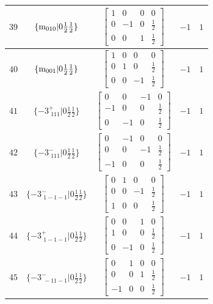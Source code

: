 \documentclass[fleqn,8pt]{jsarticle}
\begin{document}
\begin{longtable}{ccccc}
$ 39 $ & $ \{{\rm m}_{010}|0 \frac{1}{2} \frac{1}{2}\} $ & $ \begin{bmatrix} 1 & 0 & 0 & 0 \\ 0 & -1 & 0 & \frac{1}{2} \\ 0 & 0 & 1 & \frac{1}{2} \end{bmatrix} $ & $ -1 $ & $ 1 $ \\ \hline
$ 40 $ & $ \{{\rm m}_{001}|0 \frac{1}{2} \frac{1}{2}\} $ & $ \begin{bmatrix} 1 & 0 & 0 & 0 \\ 0 & 1 & 0 & \frac{1}{2} \\ 0 & 0 & -1 & \frac{1}{2} \end{bmatrix} $ & $ -1 $ & $ 1 $ \\ \hline
$ 41 $ & $ \{-3^{+}_{\,\,111}|0 \frac{1}{2} \frac{1}{2}\} $ & $ \begin{bmatrix} 0 & 0 & -1 & 0 \\ -1 & 0 & 0 & \frac{1}{2} \\ 0 & -1 & 0 & \frac{1}{2} \end{bmatrix} $ & $ -1 $ & $ 1 $ \\ \hline
$ 42 $ & $ \{-3^{-}_{\,\,111}|0 \frac{1}{2} \frac{1}{2}\} $ & $ \begin{bmatrix} 0 & -1 & 0 & 0 \\ 0 & 0 & -1 & \frac{1}{2} \\ -1 & 0 & 0 & \frac{1}{2} \end{bmatrix} $ & $ -1 $ & $ 1 $ \\ \hline
$ 43 $ & $ \{-3^{-}_{\,\,1-1-1}|0 \frac{1}{2} \frac{1}{2}\} $ & $ \begin{bmatrix} 0 & 1 & 0 & 0 \\ 0 & 0 & -1 & \frac{1}{2} \\ 1 & 0 & 0 & \frac{1}{2} \end{bmatrix} $ & $ -1 $ & $ 1 $ \\ \hline
$ 44 $ & $ \{-3^{+}_{\,\,1-1-1}|0 \frac{1}{2} \frac{1}{2}\} $ & $ \begin{bmatrix} 0 & 0 & 1 & 0 \\ 1 & 0 & 0 & \frac{1}{2} \\ 0 & -1 & 0 & \frac{1}{2} \end{bmatrix} $ & $ -1 $ & $ 1 $ \\ \hline
$ 45 $ & $ \{-3^{-}_{\,\,-11-1}|0 \frac{1}{2} \frac{1}{2}\} $ & $ \begin{bmatrix} 0 & 1 & 0 & 0 \\ 0 & 0 & 1 & \frac{1}{2} \\ -1 & 0 & 0 & \frac{1}{2} \end{bmatrix} $ & $ -1 $ & $ 1 $ \\ \hline

\end{longtable}
\end{document}
